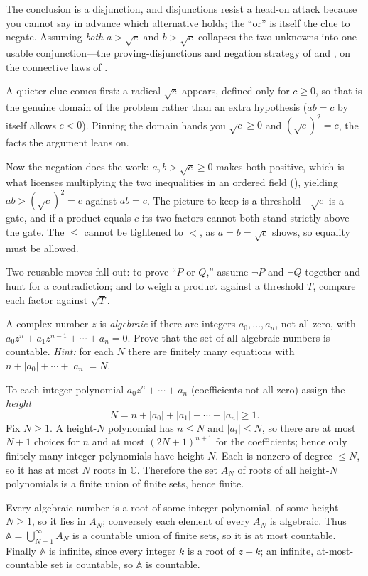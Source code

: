 \documentclass[main.tex]{subfiles}
\begin{document}
\begin{Reflection}
The conclusion is a disjunction, and disjunctions resist a head-on attack because you cannot say in
advance which alternative holds; the ``or'' is itself the clue to negate. Assuming \emph{both}
$a>\sqrt c$ and $b>\sqrt c$ collapses the two unknowns into one usable conjunction---the
proving-disjunctions and negation strategy of  and , on the connective laws
of .

A quieter clue comes first: a radical $\sqrt c$ appears, defined only for $c\ge 0$, so that is the
genuine domain of the problem rather than an extra hypothesis ($ab=c$ by itself allows $c<0$). Pinning
the domain hands you $\sqrt c\ge 0$ and $(\sqrt c)^2=c$, the facts the argument leans on.

Now the negation does the work: $a,b>\sqrt c\ge 0$ makes both positive, which is what licenses
multiplying the two inequalities in an ordered field (), yielding $ab>(\sqrt c)^2=c$
against $ab=c$. The picture to keep is a threshold---$\sqrt c$ is a gate, and if a product equals $c$
its two factors cannot both stand strictly above the gate. The $\le$ cannot be tightened to $<$, as
$a=b=\sqrt c$ shows, so equality must be allowed.

Two reusable moves fall out: to prove ``$P$ or $Q$,'' assume $\neg P$ and $\neg Q$ together and hunt
for a contradiction; and to weigh a product against a threshold $T$, compare each factor against
$\sqrt T$.
\end{Reflection}

A complex number $z$ is \emph{algebraic} if there are integers $a_0,\dots,a_n$, not all zero, with
$a_0z^n+a_1z^{n-1}+\cdots+a_n=0$. Prove that the set of all algebraic numbers is countable.
\emph{Hint:} for each $N$ there are finitely many equations with $n+|a_0|+\cdots+|a_n|=N$.

\begin{Solution}
To each integer polynomial $a_0z^n+\cdots+a_n$ (coefficients not all zero) assign the \emph{height}
\[
N=n+|a_0|+|a_1|+\cdots+|a_n|\ge 1.
\]
Fix $N\ge 1$. A height-$N$ polynomial has $n\le N$ and $|a_i|\le N$, so there are at most $N+1$ choices
for $n$ and at most $(2N+1)^{n+1}$ for the coefficients; hence only finitely many integer polynomials
have height $N$. Each is nonzero of degree $\le N$, so it has at most $N$ roots in $\mathbb C$.
Therefore the set $A_N$ of roots of all height-$N$ polynomials is a finite union of finite sets, hence
finite.

Every algebraic number is a root of some integer polynomial, of some height $N\ge 1$, so it lies in
$A_N$; conversely each element of every $A_N$ is algebraic. Thus $\mathbb A=\bigcup_{N=1}^{\infty}A_N$
is a countable union of finite sets, so it is at most countable. Finally $\mathbb A$ is infinite, since
every integer $k$ is a root of $z-k$; an infinite, at-most-countable set is countable, so $\mathbb A$
is countable.
\end{Solution}
\end{document}
